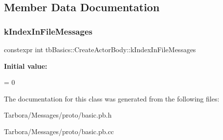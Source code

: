 \subsection{Member Data Documentation}
\mbox{\label{classtbBasics_1_1CreateActorBody_a5294f04c77723a8625ad7e148c3011dd}} 
\subsubsection{\texorpdfstring{k\+Index\+In\+File\+Messages}{kIndexInFileMessages}}
{\footnotesize\ttfamily constexpr int tb\+Basics\+::\+Create\+Actor\+Body\+::k\+Index\+In\+File\+Messages\hspace{0.3cm}{\ttfamily [static]}}

{\bfseries Initial value\+:}
\begin{DoxyCode}
=
    0
\end{DoxyCode}


The documentation for this class was generated from the following files\+:\begin{DoxyCompactItemize}
\item 
Tarbora/\+Messages/proto/basic.\+pb.\+h\item 
Tarbora/\+Messages/proto/basic.\+pb.\+cc\end{DoxyCompactItemize}
